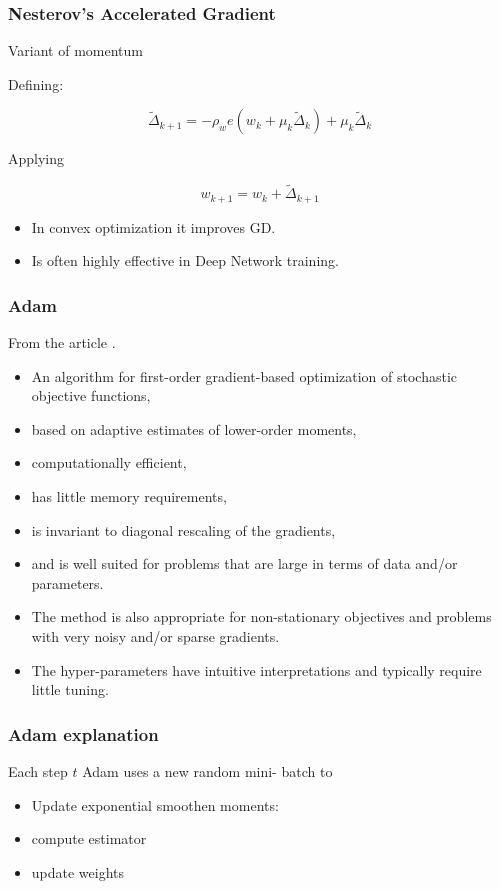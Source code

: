 \begin{frame}
  \frametitle{Nesterov's Accelerated Gradient}

  Variant of momentum 


  Defining: 

  \begin{equation}
    \tilde \Delta_{k+1}
    = 
    - \rho_w e(w_k + \mu_k \tilde \Delta_{k}  ) + \mu_k \tilde \Delta_{k} 
  \end{equation}
    
  Applying
  
  \begin{equation}
    w_{k+1} = w_k + \tilde \Delta_{k+1}
  \end{equation}

  \begin{itemize}
    \item In convex optimization it improves GD.
    \item Is often highly effective in Deep Network training. 
  \end{itemize}
  

\end{frame}

\begin{frame}
  \frametitle{Adam}
  From the article \cite{Adam}. 

  \begin{itemize}
    \item An algorithm for first-order gradient-based optimization of stochastic objective functions,
    \item based on adaptive estimates of lower-order moments,
    \item  computationally efficient, 
    \item has little memory requirements, 
    \item is invariant to diagonal rescaling of the gradients, 
    \item and is well suited for problems that are large in terms of data and/or parameters.
    \item The method is also appropriate for non-stationary objectives and problems with very noisy and/or sparse gradients. 
    \item The hyper-parameters have intuitive interpretations and typically require little tuning.
  \end{itemize}
  
\end{frame}

\begin{frame}
  \frametitle{Adam explanation}
Each step $t$ Adam uses a new random mini- batch to 

\begin{itemize}
  \item Update exponential smoothen moments: 
  \item compute estimator 
  \item update weights
\end{itemize}

\end{frame}

